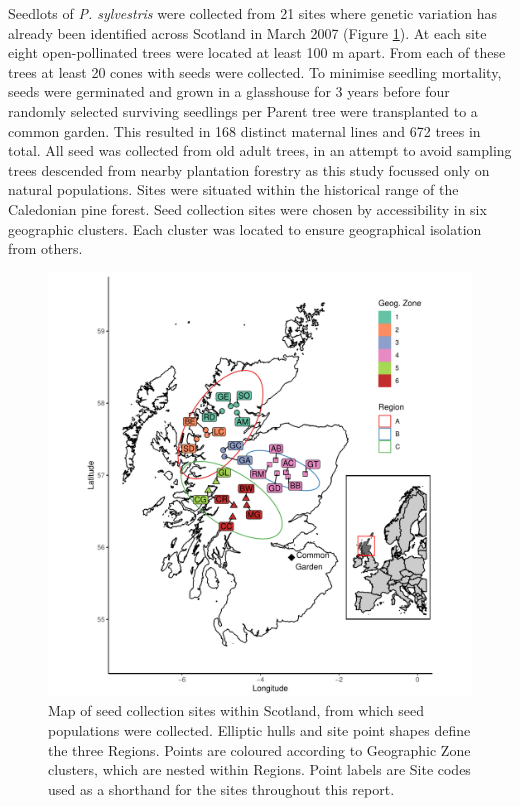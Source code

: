\documentclass[a4paper, 11pt]{article}
\begin{document}
Seedlots of \textit{P. sylvestris} were collected from 21 sites where genetic variation has already been identified across Scotland in March 2007 (Figure \ref{site_map}). At each site eight open-pollinated trees were located at least 100 m apart. From each of these trees at least 20 cones with seeds were collected. To minimise seedling mortality, seeds were germinated and grown in a glasshouse for 3 years before four randomly selected surviving seedlings per Parent tree were transplanted to a common garden. This resulted in 168 distinct maternal lines and 672 trees in total. All seed was collected from old adult trees, in an attempt to avoid sampling trees descended from nearby plantation forestry as this study focussed only on natural populations. Sites were situated within the historical range of the Caledonian pine forest. Seed collection sites were chosen by accessibility in six geographic clusters. Each cluster was located to ensure geographical isolation from others. 

\begin{figure}[H]
	\includegraphics[width=\textwidth]{site_map}
	\caption{Map of seed collection sites within Scotland, from which seed populations were collected. Elliptic hulls and site point shapes define the three Regions. Points are coloured according to Geographic Zone clusters, which are nested within Regions. Point labels are Site codes used as a shorthand for the sites throughout this report.} 
	\label{site_map}
\end{figure}
\end{document}
